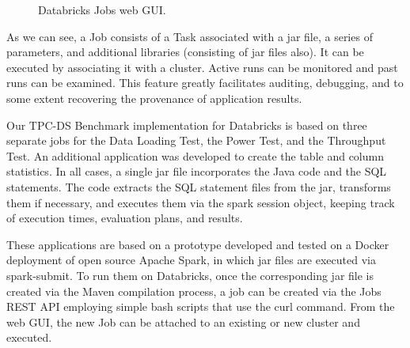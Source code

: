 \begin{figure}
   \begin{center}
   \end{center}
   \caption{Databricks Jobs web GUI.}
   \label{fig:databricksJobsGUI}
\end{figure}

As we can see, a Job consists of a Task associated with a jar file, a series of parameters, and additional libraries (consisting of jar files also). It can be executed by associating it with a cluster. Active runs can be monitored and past runs can be examined. This feature greatly facilitates auditing, debugging, and to some extent recovering the provenance of application results.

Our TPC-DS Benchmark implementation for Databricks is based on three separate jobs for the Data Loading Test, the Power Test, and the Throughput Test. An additional application was developed to create the table and column statistics. In all cases, a single jar file incorporates the Java code and the SQL statements. The code extracts the SQL statement files from the jar, transforms them if necessary, and executes them via the spark session object, keeping track of execution times, evaluation plans, and results.

These applications are based on a prototype developed and tested on a Docker deployment of open source Apache Spark, in which jar files are executed via spark-submit. To run them on Databricks, once the corresponding jar file is created via the Maven compilation process, a job can be created via the Jobs REST API employing simple bash scripts that use the curl command. From the web GUI, the new Job can be attached to an existing or new cluster and executed.

